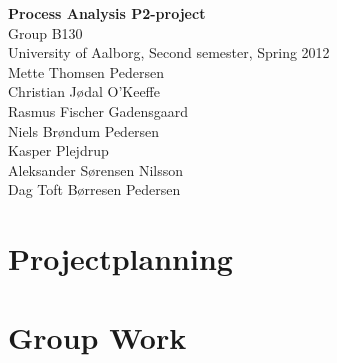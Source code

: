 

\mainmatter
\begin{center}
\textbf{\HUGE Process Analysis P2-project}\\
{\Large Group B130}\\
University of Aalborg, Second semester, Spring 2012\\


Mette Thomsen Pedersen\\
Christian Jødal O'Keeffe\\
Rasmus Fischer Gadensgaard\\
Niels Brøndum Pedersen\\
Kasper Plejdrup\\
Aleksander Sørensen Nilsson\\
Dag Toft Børresen Pedersen\\
\end{center}
\newpage


\setlength\parskip{0ex} %
\tableofcontents* %
\setlength{\parskip}{3mm} %



\pagestyle{custom}



\chapter{Projectplanning}

\chapter{Group Work}
%
%



